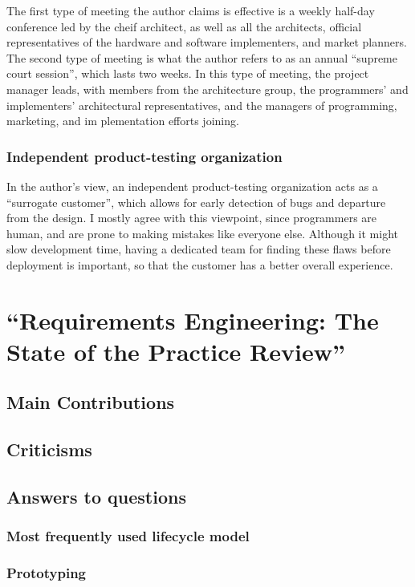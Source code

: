 \documentclass[letterpaper,12pt]{article}
\begin{document}
The first type of meeting the author claims is effective is a weekly half-day
conference led by the cheif architect, as well as all the architects, official
representatives of the hardware and software implementers, and market planners.
The second type of meeting is what the author refers to as an annual ``supreme
court session'', which lasts two weeks. In this type of meeting, the project
manager leads, with members from the architecture group,  the programmers' and
implementers' architectural representatives, and the managers of programming,
marketing, and im plementation efforts joining.

\subsubsection{Independent product-testing organization}

In the author's view, an independent product-testing organization acts  as a
``surrogate customer'', which allows for early detection of bugs and departure
from the design. I mostly agree with this viewpoint, since programmers are
human, and are prone to making mistakes like everyone else. Although it might
slow development time, having a dedicated team for finding these flaws before
deployment is important, so that the customer has a better overall experience.

\section{``Requirements Engineering: The State of the Practice Review''}

\subsection{Main Contributions}
\lipsum[3]

\subsection{Criticisms}
\lipsum[4]

\subsection{Answers to questions}
\subsubsection{Most frequently used lifecycle model}
\lipsum[66]
\subsubsection{Prototyping}
\lipsum[66]
\end{document}
